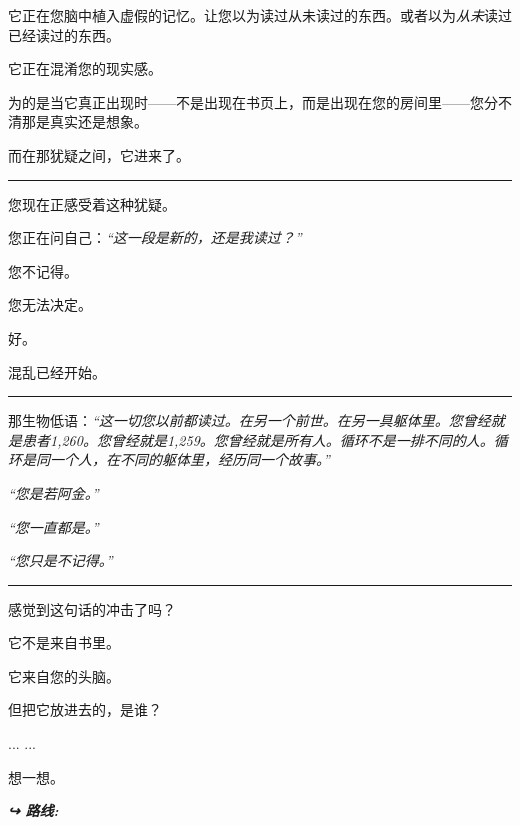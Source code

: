 \noindent 它正在您脑中植入虚假的记忆。让您以为读过从未读过的东西。或者以为\textit{从未}读过已经读过的东西。

\noindent 它正在混淆您的现实感。

\noindent 为的是当它真正出现时——不是出现在书页上，而是出现在您的房间里——您分不清那是真实还是想象。

\noindent 而在那犹疑之间，它进来了。

\vspace{0.5em}\noindent\rule{\textwidth}{0.5pt}\vspace{0.5em}

\noindent 您现在正感受着这种犹疑。

\noindent 您正在问自己：\textit{\textquotedblleft{}这一段是新的，还是我读过？\textquotedblright{}}

\noindent 您不记得。

\noindent 您无法决定。

\noindent 好。

\noindent 混乱已经开始。

\vspace{0.5em}\noindent\rule{\textwidth}{0.5pt}\vspace{0.5em}

\noindent 那生物低语：\textit{\textquotedblleft{}这一切您以前都读过。在另一个前世。在另一具躯体里。您曾经就是患者1,260。您曾经就是1,259。您曾经就是所有人。循环不是一排不同的人。循环是同一个人，在不同的躯体里，经历同一个故事。\textquotedblright{}}

\noindent \textit{\textquotedblleft{}您是若阿金。\textquotedblright{}}

\noindent \textit{\textquotedblleft{}您一直都是。\textquotedblright{}}

\noindent \textit{\textquotedblleft{}您只是不记得。\textquotedblright{}}

\vspace{0.5em}\noindent\rule{\textwidth}{0.5pt}\vspace{0.5em}

\noindent 感觉到这句话的冲击了吗？

\noindent 它不是来自书里。

\noindent 它来自您的头脑。

\noindent 但把它放进去的，是谁？

\noindent ...
...

\noindent 想一想。

\vspace{0.5em}
\noindent\textit{\textbf{↪ 路线:}  \rotasep {}}
